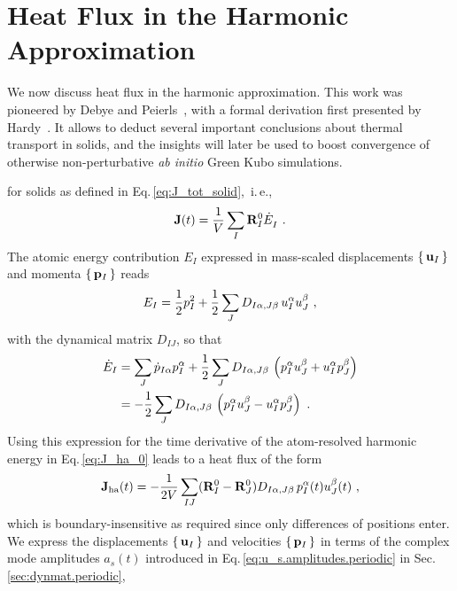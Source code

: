 \section{Heat Flux in the Harmonic Approximation}
We now discuss heat flux in the harmonic approximation. This work was pioneered by Debye and Peierls~\cite{Debye1914,Peierls1929}, with a formal derivation first presented by Hardy~\cite{Hardy1963}. It allows to deduct several important conclusions about thermal transport in solids, and the insights will later be used to boost convergence of otherwise non-perturbative \emph{ab initio} Green Kubo simulations.

 for solids as defined in Eq.\,\eqref{eq:J_tot_solid},~i.\,e.,
\begin{align}
	\b J (t) 
		= \frac{1}{V} \sum_I \b R_I^0 \fD{\dot{E}}_I~.
		\label{eq:J_ha_0}
\end{align}
The atomic energy contribution $E_I$ expressed in mass-scaled displacements $\set{{\bf u}_I}$ and momenta $\set{{\bf p}_I}$ reads
\begin{align}
	E_I = \frac{1}{2} p_I^2 + \frac{1}{2} \sum_J D_{I \alpha , J \beta} \, u_I^\alpha u_J^\beta~,
\end{align}
with the dynamical matrix $D_{IJ}$, so that
\begin{align}
	\dot E_I 
		&= \sum_J \dot{p}_{I\alpha} p_I^\alpha 
		+ \halb \sum_J D_{I \alpha , J \beta} \, 
			\left( p_I^\alpha u_J^\beta + u_I^\alpha p_J^\beta\right) \nonumber \\ 
		&= -\halb \sum_J D_{I \alpha , J \beta} \, 
		\left( p_I^\alpha u_J^\beta - u_I^\alpha p_J^\beta\right) ~.
		\label{eq:dotE_I}
\end{align}
Using this expression for the time derivative of the atom-resolved harmonic energy  in Eq.\,\eqref{eq:J_ha_0} leads to a heat flux of the form
\begin{align}
    \b J_{\rm ha} (t) = - \frac{1}{2V} \sum_{IJ} (\b R_I^0 - \b R_J^0) D_{I \alpha, J \beta} \, p_I^\alpha (t) u_J^\beta (t)~,
   \label{eq:J_ha_r}
\end{align}
which is boundary-insensitive as required since only differences of positions enter.
We express the displacements $\set {{\bf u}_I}$ and velocities $\set{{\bf p}_I}$ in terms of the complex mode amplitudes $a_s (t)$ introduced in Eq.\,\eqref{eq:u_s.amplitudes.periodic} in Sec.\,\ref{sec:dynmat.periodic},
